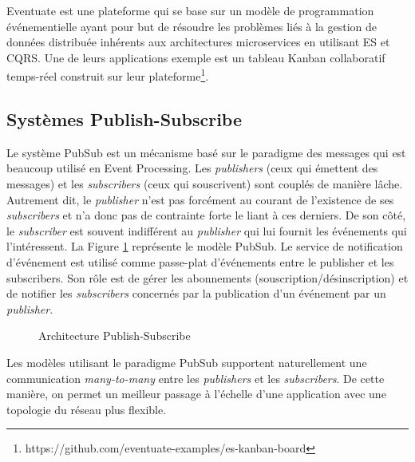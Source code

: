 Eventuate est une plateforme qui se base sur un modèle de programmation 
événementielle ayant pour but de résoudre les problèmes liés à la gestion de 
données distribuée inhérents aux architectures microservices en utilisant \gls{ES} et 
\gls{CQRS}. Une de leurs applications exemple est un tableau Kanban collaboratif 
temps-réel construit sur leur 
plateforme\footnote{https://github.com/eventuate-examples/es-kanban-board}. 
	\subsection{Systèmes Publish-Subscribe}

Le système \gls{PubSub} est un mécanisme basé sur le 
paradigme des 
messages qui est beaucoup utilisé en Event Processing. 
Les \textit{publishers} (ceux qui émettent des messages) et les \textit{subscribers} 
(ceux qui souscrivent) sont couplés de manière lâche. 
Autrement dit, le \textit{publisher} n'est pas forcément au courant de l'existence de 
ses \textit{subscribers} et n'a donc pas de contrainte forte le liant à ces derniers. 
De son côté, le \textit{subscriber} est souvent indifférent au \textit{publisher} qui lui 
fournit les événements qui l'intéressent. La Figure \ref{fig:pubsub} représente le 
modèle \gls{PubSub}.
Le service de notification d'événement est utilisé comme passe-plat d'événements 
entre le publisher et les subscribers. Son rôle est de gérer les abonnements 
(souscription/désinscription) et de notifier les \textit{subscribers} concernés par la 
publication d'un événement par un \textit{publisher}.

\begin{figure}[ht!]
	\centering
	\caption{Architecture Publish-Subscribe}
	\label{fig:pubsub}
\end{figure}


Les modèles utilisant le paradigme \gls{PubSub} supportent naturellement une 
communication \textit{many-to-many} 
entre les \textit{publishers} et les \textit{subscribers}.  De cette manière, on permet 
un meilleur passage à l'échelle d'une application avec une topologie du réseau plus 
flexible. 


